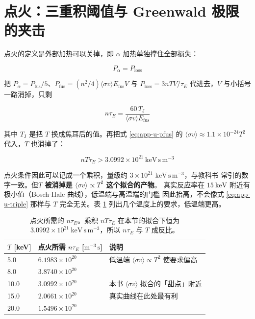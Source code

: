 \section{点火：三重积阈值与 Greenwald 极限的夹击}
\label{sec:app-u-ignition}

点火的定义是外部加热可以关掉，即 $\alpha$ 加热单独撑住全部损失：

\begin{equation}
P_\alpha = P_{\mathrm{loss}}
\label{eq:app-u-ignition}
\end{equation}

把 $P_\alpha = P_{\mathrm{fus}}/5$、$P_{\mathrm{fus}} = (n^2/4)\langle\sigma v\rangle E_{\mathrm{fus}}V$
与 $P_{\mathrm{loss}} = 3nTV/\tau_E$ 代进去，$V$ 与小括号一路消掉，只剩

\begin{equation}
n\tau_E = \frac{60\,T_{\mathrm J}}{\langle\sigma v\rangle E_{\mathrm{fus}}}
\label{eq:app-u-ntau}
\end{equation}

其中 $T_{\mathrm J}$ 是把 $T$ 换成焦耳后的值。再把式 \eqref{eq:app-u-pfus} 的
$\langle\sigma v\rangle \approx 1.1\times10^{-24}T^2$ 代入，$T$ 也消掉了：

\begin{equation}
nT\tau_E > 3.0992\times10^{21}\ \mathrm{keV\,s\,m^{-3}}
\label{eq:app-u-triple}
\end{equation}

点火条件因此可以记成一个乘积，量级约 $3\times10^{21}$ $\mathrm{keV\,s\,m^{-3}}$，与教科书
常引的数字一致。但\textbf{$T$ 被消掉是 $\langle\sigma v\rangle \propto T^2$ 这个拟合的产物}。
真实反应率在 $15\ \mathrm{keV}$ 附近有极小值（Bosch-Hale 曲线），低温端与高温端的门槛
因此抬高，不会像式 \eqref{eq:app-u-triple} 那样与 $T$ 完全无关。表 \ref{tab:app-u-triple}
列出几个温度上的要求，低温端更高。

\begin{table}[htbp]
\centering
\small
\caption{点火所需的 $n\tau_E$。乘积 $nT\tau_E$ 在本节的拟合下恒为
$3.0992\times10^{21}\ \mathrm{keV\,s\,m^{-3}}$，所以 $n\tau_E$ 与 $T$ 成反比。}
\label{tab:app-u-triple}
\begin{tabular}{@{}p{2.0cm}p{5.0cm}p{5.2cm}@{}}
\toprule
$T$ [keV] & 点火所需 $n\tau_E$ [$\mathrm{m^{-3}\,s}$] & 说明 \\
\midrule
5.0  & $6.1983\times10^{20}$ & 低温端 $\langle\sigma v\rangle\propto T^2$ 使要求偏高 \\
8.0  & $3.8740\times10^{20}$ & \\
10.0 & $3.0992\times10^{20}$ & 本书 $\langle\sigma v\rangle$ 拟合的「甜点」附近 \\
15.0 & $2.0661\times10^{20}$ & 真实曲线在此处最有利 \\
20.0 & $1.5496\times10^{20}$ & \\
\bottomrule
\end{tabular}

\end{table}

